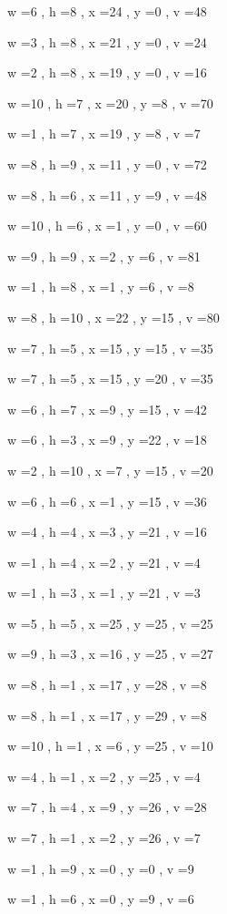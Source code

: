 \documentclass[11pt]{article}
\begin{document}
w =6 , h =8 , x =24 , y =0 , v =48
\par
w =3 , h =8 , x =21 , y =0 , v =24
\par
w =2 , h =8 , x =19 , y =0 , v =16
\par
w =10 , h =7 , x =20 , y =8 , v =70
\par
w =1 , h =7 , x =19 , y =8 , v =7
\par
w =8 , h =9 , x =11 , y =0 , v =72
\par
w =8 , h =6 , x =11 , y =9 , v =48
\par
w =10 , h =6 , x =1 , y =0 , v =60
\par
w =9 , h =9 , x =2 , y =6 , v =81
\par
w =1 , h =8 , x =1 , y =6 , v =8
\par
w =8 , h =10 , x =22 , y =15 , v =80
\par
w =7 , h =5 , x =15 , y =15 , v =35
\par
w =7 , h =5 , x =15 , y =20 , v =35
\par
w =6 , h =7 , x =9 , y =15 , v =42
\par
w =6 , h =3 , x =9 , y =22 , v =18
\par
w =2 , h =10 , x =7 , y =15 , v =20
\par
w =6 , h =6 , x =1 , y =15 , v =36
\par
w =4 , h =4 , x =3 , y =21 , v =16
\par
w =1 , h =4 , x =2 , y =21 , v =4
\par
w =1 , h =3 , x =1 , y =21 , v =3
\par
w =5 , h =5 , x =25 , y =25 , v =25
\par
w =9 , h =3 , x =16 , y =25 , v =27
\par
w =8 , h =1 , x =17 , y =28 , v =8
\par
w =8 , h =1 , x =17 , y =29 , v =8
\par
w =10 , h =1 , x =6 , y =25 , v =10
\par
w =4 , h =1 , x =2 , y =25 , v =4
\par
w =7 , h =4 , x =9 , y =26 , v =28
\par
w =7 , h =1 , x =2 , y =26 , v =7
\par
w =1 , h =9 , x =0 , y =0 , v =9
\par
w =1 , h =6 , x =0 , y =9 , v =6
\par
\newpage


\end{document}
